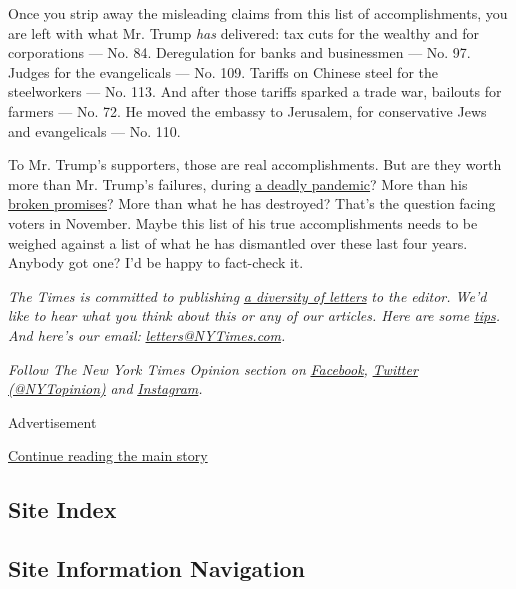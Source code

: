 Once you strip away the misleading claims from this list of
accomplishments, you are left with what Mr. Trump \emph{has} delivered:
tax cuts for the wealthy and for corporations --- No. 84. Deregulation
for banks and businessmen --- No. 97. Judges for the evangelicals ---
No. 109. Tariffs on Chinese steel for the steelworkers --- No. 113. And
after those tariffs sparked a trade war, bailouts for farmers --- No.
72. He moved the embassy to Jerusalem, for conservative Jews and
evangelicals --- No. 110.

To Mr. Trump's supporters, those are real accomplishments. But are they
worth more than Mr. Trump's failures, during
\href{https://www.nytimes3xbfgragh.onion/interactive/2020/08/12/us/covid-deaths-us.html}{a
deadly pandemic}? More than his
\href{https://www.politifact.com/truth-o-meter/promises/trumpometer/?ruling=true}{broken
promises}? More than what he has destroyed? That's the question facing
voters in November. Maybe this list of his true accomplishments needs to
be weighed against a list of what he has dismantled over these last four
years. Anybody got one? I'd be happy to fact-check it.

\emph{The Times is committed to publishing}
\href{https://www.nytimes3xbfgragh.onion/2019/01/31/opinion/letters/letters-to-editor-new-york-times-women.html}{\emph{a
diversity of letters}} \emph{to the editor. We'd like to hear what you
think about this or any of our articles. Here are some}
\href{https://help.nytimes3xbfgragh.onion/hc/en-us/articles/115014925288-How-to-submit-a-letter-to-the-editor}{\emph{tips}}\emph{.
And here's our email:}
\href{mailto:letters@NYTimes.com}{\emph{letters@NYTimes.com}}\emph{.}

\emph{Follow The New York Times Opinion section on}
\href{https://www.facebookcorewwwi.onion/nytopinion}{\emph{Facebook}}\emph{,}
\href{http://twitter.com/NYTOpinion}{\emph{Twitter (@NYTopinion)}}
\emph{and}
\href{https://www.instagram.com/nytopinion/}{\emph{Instagram}}\emph{.}

Advertisement

\protect\hyperlink{after-bottom}{Continue reading the main story}

\hypertarget{site-index}{%
\subsection{Site Index}\label{site-index}}

\hypertarget{site-information-navigation}{%
\subsection{Site Information
Navigation}\label{site-information-navigation}}

